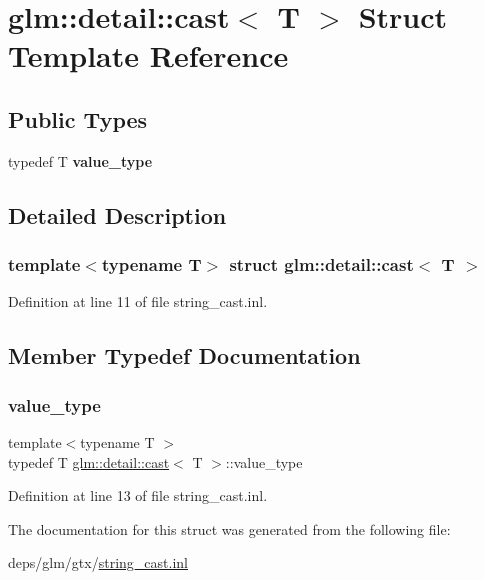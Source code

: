 \hypertarget{structglm_1_1detail_1_1cast}{}\section{glm\+:\+:detail\+:\+:cast$<$ T $>$ Struct Template Reference}
\label{structglm_1_1detail_1_1cast}
\subsection*{Public Types}
\begin{DoxyCompactItemize}
\item 
\mbox{\label{structglm_1_1detail_1_1cast_aee0fcb3ea7c887fbc9fbe700a8b758b7}} 
typedef T {\bfseries value\+\_\+type}
\end{DoxyCompactItemize}


\subsection{Detailed Description}
\subsubsection*{template$<$typename T$>$\newline
struct glm\+::detail\+::cast$<$ T $>$}



Definition at line 11 of file string\+\_\+cast.\+inl.



\subsection{Member Typedef Documentation}
\mbox{\label{structglm_1_1detail_1_1cast_aee0fcb3ea7c887fbc9fbe700a8b758b7}} 
\subsubsection{\texorpdfstring{value\+\_\+type}{value\_type}}
{\footnotesize\ttfamily template$<$typename T $>$ \\
typedef T \hyperlink{structglm_1_1detail_1_1cast}{glm\+::detail\+::cast}$<$ T $>$\+::value\+\_\+type}



Definition at line 13 of file string\+\_\+cast.\+inl.



The documentation for this struct was generated from the following file\+:\begin{DoxyCompactItemize}
\item 
deps/glm/gtx/\hyperlink{string__cast_8inl}{string\+\_\+cast.\+inl}\end{DoxyCompactItemize}

